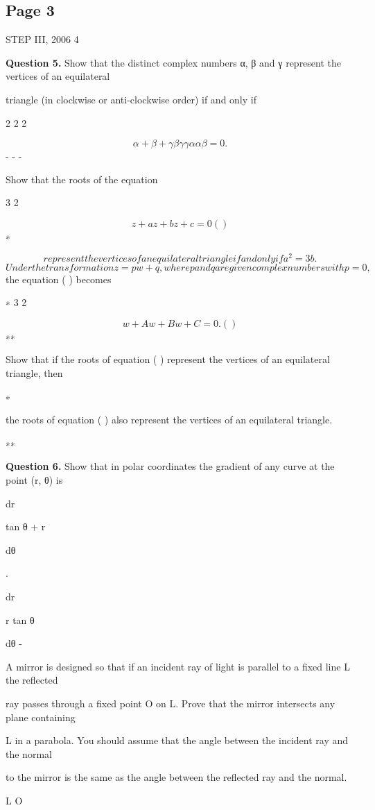 \documentclass[12pt]{article}
\begin{document}
\subsection*{Page 3}
\begin{flushleft}
STEP III, 2006 4\par
\bigskip\textbf{Question 5.} Show that the distinct complex numbers α, β and γ represent the vertices of an equilateral\par
triangle (in clockwise or anti-clockwise order) if and only if\par
2 2 2\par
\[α + β + γ βγ γα αβ = 0 .\]
- - -\par
Show that the roots of the equation\par
3 2\par
\[z + az + bz + c = 0 ( )\]
∗\par
\[represent the vertices of an equilateral triangle if and only if a^2 = 3b.\]
\[Under the transformation z = pw + q, where p and q are given complex numbers with p = 0,\]
the equation ( ) becomes\par
∗ 3 2\par
\[w + Aw + Bw + C = 0 . ( )\]
∗∗\par
Show that if the roots of equation ( ) represent the vertices of an equilateral triangle, then\par
∗\par
the roots of equation ( ) also represent the vertices of an equilateral triangle.\par
∗∗\par
\bigskip\textbf{Question 6.} Show that in polar coordinates the gradient of any curve at the point (r, θ) is\par
dr\par
tan θ + r\par
dθ\par
.\par
dr\par
r tan θ\par
dθ -\par
A mirror is designed so that if an incident ray of light is parallel to a fixed line L the reflected\par
ray passes through a fixed point O on L. Prove that the mirror intersects any plane containing\par
L in a parabola. You should assume that the angle between the incident ray and the normal\par
to the mirror is the same as the angle between the reflected ray and the normal.\par
L O\par
\end{flushleft}
\end{document}
